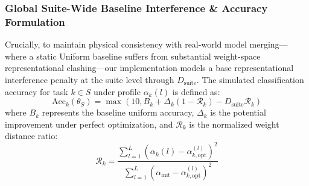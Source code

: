 \subsubsection{Global Suite-Wide Baseline Interference \& Accuracy Formulation}
Crucially, to maintain physical consistency with real-world model merging—where a static Uniform baseline suffers from substantial weight-space representational clashing—our implementation models a base representational interference penalty at the suite level through $D_{\text{suite}}$.
The simulated classification accuracy for task $k \in S$ under profile $\alpha_k(l)$ is defined as:
\begin{equation}
\label{eq:accuracy}
\text{Acc}_k(\theta_S) = \max\left(10, B_k + \Delta_k (1 - \mathcal{R}_k) - D_{\text{suite}} \mathcal{R}_k\right)
\end{equation}
where $B_k$ represents the baseline uniform accuracy, $\Delta_k$ is the potential improvement under perfect optimization, and $\mathcal{R}_k$ is the normalized weight distance ratio:
\begin{equation}
\label{eq:ratio}
\mathcal{R}_k = \frac{\sum_{l=1}^L \left(\alpha_k(l) - \alpha_{k, \text{opt}}^{(l)}\right)^2}{\sum_{l=1}^L \left(\alpha_{\text{init}} - \alpha_{k, \text{opt}}^{(l)}\right)^2}
\end{equation}
